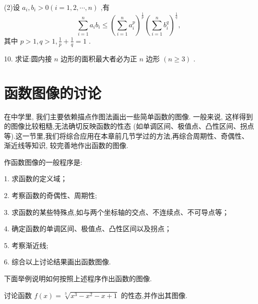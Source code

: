 (2)设 \({a}_{i},{b}_{i} > 0\left( {i = 1,2,\cdots ,n}\right)\) ,有
\[
\mathop{\sum }\limits_{{i = 1}}^{n}{a}_{i}{b}_{i} \leq  {\left( \mathop{\sum }\limits_{{i = 1}}^{n}{a}_{i}^{p}\right) }^{\frac{1}{p}}{\left( \mathop{\sum }\limits_{{i = 1}}^{n}{b}_{i}^{q}\right) }^{\frac{1}{q}},
\]
其中 \(p > 1,q > 1,\frac{1}{p} + \frac{1}{q} = 1\) .

10. 求证:圆内接 \(n\) 边形的面积最大者必为正 \(n\) 边形 \(\left( {n \geq  3}\right)\) .

\section{函数图像的讨论}

在中学里, 我们主要依赖描点作图法画出一些简单函数的图像. 一般来说, 这样得到的图像比较粗糙,无法确切反映函数的性态 (如单调区间、极值点、凸性区间、拐点等).这一节里,我们将综合应用在本章前几节学过的方法,再综合周期性、奇偶性、渐近线等知识, 较完善地作出函数的图像.

作函数图像的一般程序是:

1. 求函数的定义域；

2. 考察函数的奇偶性、周期性;

3. 求函数的某些特殊点,如与两个坐标轴的交点、不连续点、不可导点等；

4. 确定函数的单调区间、极值点、凸性区间以及拐点；

5. 考察渐近线;

6. 综合以上讨论结果画出函数图像.

下面举例说明如何按照上述程序作出函数的图像.

\begin{example}
讨论函数 \(f\left( x\right)  = \sqrt[3]{{x}^{3} - {x}^{2} - x + 1}\) 的性态,并作出其图像.
\end{example}

